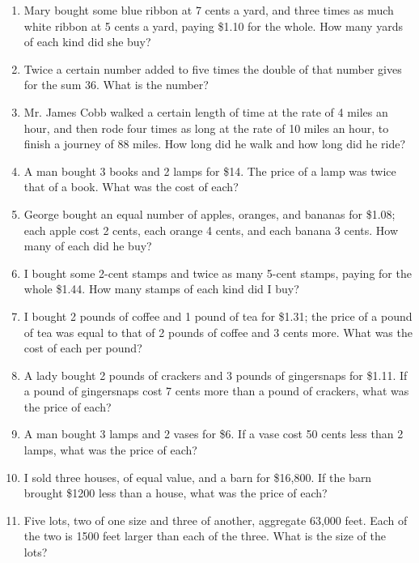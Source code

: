 \documentclass{book}
\begin{document}
\begin{enumerate}
\item Mary bought some blue ribbon at 7 cents a yard, and three
times as much white ribbon at 5 cents a yard, paying \$1.10 for
the whole. How many yards of each kind did she buy?

\item Twice a certain number added to five times the double of
that number gives for the sum 36. What is the number?

\item Mr. James Cobb walked a certain length of time at the rate
of 4 miles an hour, and then rode four times as long at the rate
of 10 miles an hour, to finish a journey of 88 miles. How long did
he walk and how long did he ride?

\item A man bought 3 books and 2 lamps for \$14. The price of a
lamp was twice that of a book. What was the cost of each?

\item George bought an equal number of apples, oranges, and
bananas for \$1.08; each apple cost 2 cents, each orange 4 cents,
and each banana 3 cents. How many of each did he buy?

\item I bought some 2-cent stamps and twice as many 5-cent stamps,
paying for the whole \$1.44. How many stamps of each kind did I
buy?

\item I bought 2 pounds of coffee and 1 pound of tea for \$1.31;
the price of a pound of tea was equal to that of 2 pounds of
coffee and 3 cents more. What was the cost of each per pound?

\item A lady bought 2 pounds of crackers and 3 pounds of
gingersnaps for \$1.11. If a pound of gingersnaps cost 7 cents
more than a pound of crackers, what was the price of each?

\item A man bought 3 lamps and 2 vases for \$6. If a vase cost 50
cents less than 2 lamps, what was the price of each?

\item I sold three houses, of equal value, and a barn for
\$16,800. If the barn brought \$1200 less than a house, what was
the price of each?

\item Five lots, two of one size and three of another, aggregate
63,000 feet. Each of the two is 1500 feet larger than each of the
three. What is the size of the lots?


\end{enumerate}
\end{document}
